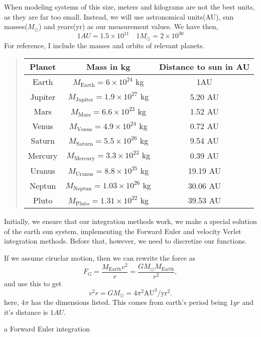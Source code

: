 \documentclass[10pt, twocolumn]{revtex4-1}
\begin{document}
When modeling systems of this size, meters and kilograms are not the best units, as they
are far too small. Instead, we will use astronomical units(AU), sun masses($M_{\odot}$) and years(yr) as our
measurement values. We have then,
\[
    1 AU = 1.5\times 10^{11} \quad 1 M_{\odot} = 2\times 10^{30}
\]
For reference, I include the masses and orbits of relevant planets.\cite{project3pdf}
\begin{quote}
\begin{tabular}{ccc}
\hline
\multicolumn{1}{c}{ Planet } & \multicolumn{1}{c}{ Mass in kg } & \multicolumn{1}{c}{ Distance to  sun in AU } \\
\hline
Earth   & $M_{\mathrm{Earth}}=6\times 10^{24}$ kg     & 1AU                    \\
Jupiter & $M_{\mathrm{Jupiter}}=1.9\times 10^{27}$ kg & 5.20 AU                \\
Mars    & $M_{\mathrm{Mars}}=6.6\times 10^{23}$ kg    & 1.52 AU                \\
Venus   & $M_{\mathrm{Venus}}=4.9\times 10^{24}$ kg   & 0.72 AU                \\
Saturn  & $M_{\mathrm{Saturn}}=5.5\times 10^{26}$ kg  & 9.54 AU                \\
Mercury & $M_{\mathrm{Mercury}}=3.3\times 10^{23}$ kg & 0.39 AU                \\
Uranus  & $M_{\mathrm{Uranus}}=8.8\times 10^{25}$ kg  & 19.19 AU               \\
Neptun  & $M_{\mathrm{Neptun}}=1.03\times 10^{26}$ kg & 30.06 AU               \\
Pluto   & $M_{\mathrm{Pluto}}=1.31\times 10^{22}$ kg  & 39.53 AU               \\
\hline
\end{tabular}
\end{quote}

Initially, we ensure that our integration methods work, we make a special solution of the earth sun system, implementing
the Forward Euler and velocity Verlet integration methods. Before that, however, we need to discretize our functions. 

If we assume ciruclar motion, then we can rewrite the force as 
\[
F_G= \frac{M_{\mathrm{Earth}}v^2}{r}=\frac{GM_{\odot}M_{\mathrm{Earth}}}{r^2},
\]
and use this to get 
\[
v^2r=GM_{\odot}=4\pi^2\mathrm{AU}^3/\mathrm{yr}^2.
\]
here, $4\pi$ has the dimensions listed. This comes from earth's period being $1 yr$ and it's distance is $1 AU$. 

\begin{algorithm}
    \caption{a Forward Euler integration}
\end{algorithm}
\end{document}
